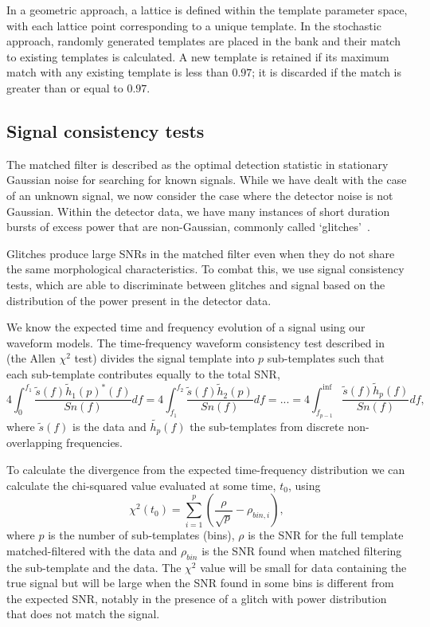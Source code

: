 In a geometric approach, a lattice is defined within the template parameter space, with each lattice point corresponding to a unique template. In the stochastic approach, randomly generated templates are placed in the bank and their match to existing templates is calculated. A new template is retained if its maximum match with any existing template is less than $0.97$; it is discarded if the match is greater than or equal to $0.97$.

\subsection{\label{2:sec:signal-consistency}Signal consistency tests}

The matched filter is described as the optimal detection statistic in stationary Gaussian noise for searching for known signals. While we have dealt with the case of an unknown signal, we now consider the case where the detector noise is not Gaussian. Within the detector data, we have many instances of short duration bursts of excess power that are non-Gaussian, commonly called `glitches'~\cite{LIGO_data_quality:2015}.

Glitches produce large SNRs in the matched filter even when they do not share the same morphological characteristics. To combat this, we use signal consistency tests, which are able to discriminate between glitches and signal based on the distribution of the power present in the detector data.

We know the expected time and frequency evolution of a \gwadj signal using our waveform models. The time-frequency waveform consistency test described in~\cite{Allen_Chi:2005} (the Allen $\chi^{2}$ test) divides the signal template into $p$ sub-templates such that each sub-template contributes equally to the total SNR,
%
\begin{equation}
    4 \int^{f_{1}}_{0}\frac{\tilde{s}(f) \tilde{h}_{1}(p)^*(f)}{Sn(f)}df = 4 \int^{f_{2}}_{f_{1}}\frac{\tilde{s}(f) \tilde{h}_{2}(p)}{Sn(f)}df = ... =  4 \int^{\inf}_{f_{p-1}}\frac{\tilde{s}(f) \tilde{h}_{p}(f)}{Sn(f)}df ,
\end{equation}
%
where $\tilde{s}(f)$ is the data and $\tilde{h_{p}}(f)$ the sub-templates from discrete non-overlapping frequencies.

To calculate the divergence from the expected time-frequency distribution we can calculate the chi-squared value evaluated at some time, $t_{0}$, using
%
\begin{equation}
    \chi^{2}(t_{0}) = \sum^{p}_{i=1} \left(\frac{\rho}{\sqrt{p}} - \rho_{bin, i}\right),
\end{equation}
%
where $p$ is the number of sub-templates (bins), $\rho$ is the SNR for the full template matched-filtered with the data and $\rho_{bin}$ is the SNR found when matched filtering the sub-template and the data. The $\chi^{2}$ value will be small for data containing the true signal but will be large when the SNR found in some bins is different from the expected SNR, notably in the presence of a glitch with power distribution that does not match the signal.

